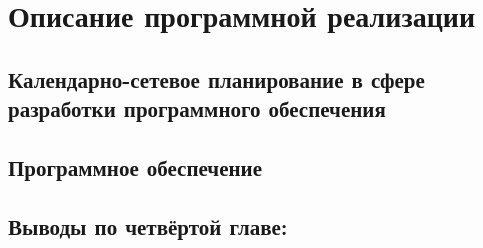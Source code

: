 \chapter{Описание программной реализации}
\label{chapter4}

\section{Календарно-сетевое планирование в сфере разработки программного обеспечения} 
\label{chapter4_1}


\section{Программное обеспечение} 
\label{chapter4_2}


\newpage
\section*{Выводы по четвёртой главе:} 
\label{chapter4_3}
